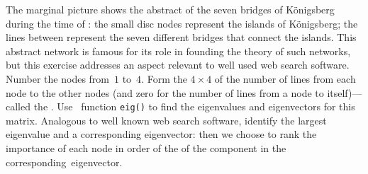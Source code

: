 \begin{exercise}  
The marginal picture shows the abstract  of the seven bridges of K\"onigsberg during the time of : the small disc nodes represent the islands of K\"onigsberg; the lines between represent the seven different bridges that connect the islands.
%
This abstract network is famous for its role in founding the theory of such networks, but this exercise addresses an aspect relevant to well used web search software.
Number the nodes from~\(1\) to~\(4\).
Form the \(4\times 4\)  of the number of lines from each node to the other nodes (and zero for the number of lines from a node to itself)---called the .
Use \script\ function \verb|eig()| to find the eigenvalues and eigenvectors for this matrix.
Analogous to well known web search software, identify the largest eigenvalue and a corresponding eigenvector:  then we choose to rank the importance of each node in order of the  of the component in the corresponding~eigenvector.
\end{exercise}



